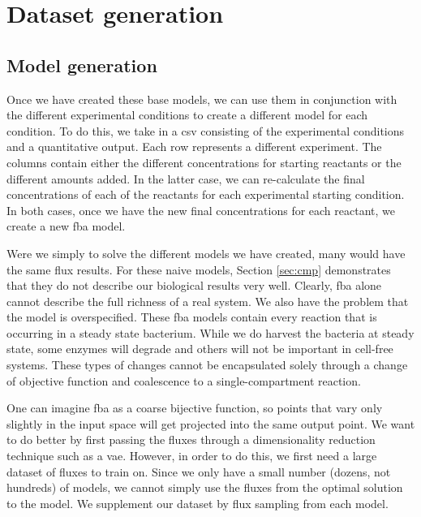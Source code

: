 
\section{Dataset generation}

\subsection{Model generation}
Once we have created these base models, we can use them in conjunction with the different experimental conditions to create a different model for each condition.
To do this, we take in a \gls{csv} consisting of the experimental conditions and a quantitative output.
Each row represents a different experiment.
The columns contain either the different concentrations for starting reactants or the different amounts added.
In the latter case, we can re-calculate the final concentrations of each of the reactants for each experimental starting condition.
In both cases, once we have the new final concentrations for each reactant, we create a new \gls{fba} model.

Were we simply to solve the different models we have created, many would have the same flux results.
For these naive models, Section \ref{sec:cmp} demonstrates that they do not describe our biological results very well.
Clearly, \gls{fba} alone cannot describe the full richness of a real system.
We also have the problem that the model is overspecified.
These \gls{fba} models contain every reaction that is occurring in a steady state bacterium.
While we do harvest the bacteria at steady state, some enzymes will degrade and others will not be important in cell-free systems.
These types of changes cannot be encapsulated solely through a change of objective function and coalescence to a single-compartment reaction.

One can imagine \gls{fba} as a coarse bijective function, so points that vary only slightly in the input space will get projected into the same output point.
We want to do better by first passing the fluxes through a dimensionality reduction technique such as a \gls{vae}.
However, in order to do this, we first need a large dataset of fluxes to train on.
Since we only have a small number (dozens, not hundreds) of models, we cannot simply use the fluxes from the optimal solution to the model.
We supplement our dataset by flux sampling from each model.

